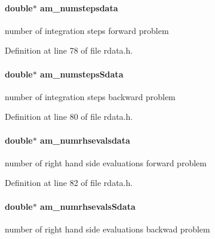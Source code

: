 \hypertarget{struct_return_data_a2ebada170b4bc6a2337794e4ec08d77c}{}
\paragraph[{am\+\_\+numstepsdata}]{\setlength{\rightskip}{0pt plus 5cm}double$\ast$ am\+\_\+numstepsdata}\label{struct_return_data_a2ebada170b4bc6a2337794e4ec08d77c}
number of integration steps forward problem 

Definition at line 78 of file rdata.\+h.

\hypertarget{struct_return_data_a6852d3762d59842903ef737ed511dc43}{}
\paragraph[{am\+\_\+numsteps\+Sdata}]{\setlength{\rightskip}{0pt plus 5cm}double$\ast$ am\+\_\+numsteps\+Sdata}\label{struct_return_data_a6852d3762d59842903ef737ed511dc43}
number of integration steps backward problem 

Definition at line 80 of file rdata.\+h.

\hypertarget{struct_return_data_a480d4eb0a1a568f64b8e939105a0b627}{}
\paragraph[{am\+\_\+numrhsevalsdata}]{\setlength{\rightskip}{0pt plus 5cm}double$\ast$ am\+\_\+numrhsevalsdata}\label{struct_return_data_a480d4eb0a1a568f64b8e939105a0b627}
number of right hand side evaluations forward problem 

Definition at line 82 of file rdata.\+h.

\hypertarget{struct_return_data_a77e958126968de6f5ee3bd1d22129641}{}
\paragraph[{am\+\_\+numrhsevals\+Sdata}]{\setlength{\rightskip}{0pt plus 5cm}double$\ast$ am\+\_\+numrhsevals\+Sdata}\label{struct_return_data_a77e958126968de6f5ee3bd1d22129641}
number of right hand side evaluations backwad problem 

